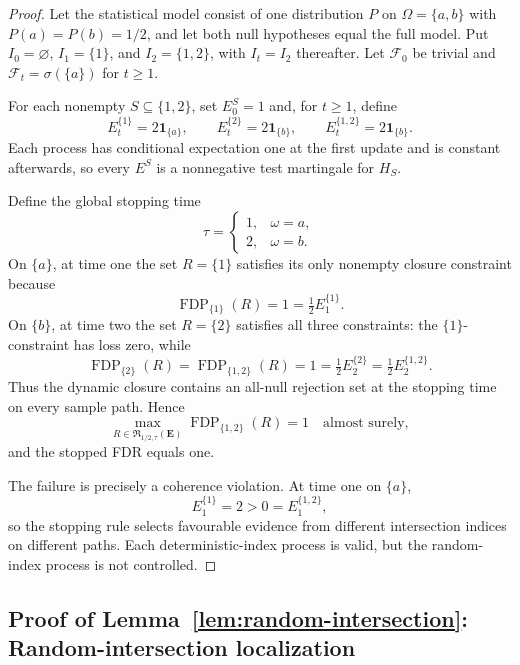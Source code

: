 \documentclass[11pt]{article}
\numberwithin{equation}{section}
\theoremstyle{plain}
\theoremstyle{definition}
\newcommand{\F}{\mathcal F}
\newcommand{\Rfam}{\mathfrak R}
\newcommand{\FDP}{\operatorname{FDP}}
\newcommand{\one}{\mathbf 1}
\begin{document}
\begin{proof}
Let the statistical model consist of one distribution $P$ on $\Omega=\{a,b\}$ with $P(a)=P(b)=1/2$, and let both null hypotheses equal the full model. Put $I_0=\varnothing$, $I_1=\{1\}$, and $I_2=\{1,2\}$, with $I_t=I_2$ thereafter. Let $\F_0$ be trivial and $\F_t=\sigma(\{a\})$ for $t\geq1$.

For each nonempty $S\subseteq\{1,2\}$, set $E_0^S=1$ and, for $t\geq1$, define
\[
 E_t^{\{1\}}=2\one_{\{a\}},\qquad
 E_t^{\{2\}}=2\one_{\{b\}},\qquad
 E_t^{\{1,2\}}=2\one_{\{b\}}.
\]
Each process has conditional expectation one at the first update and is constant afterwards, so every $E^S$ is a nonnegative test martingale for $H_S$.

Define the global stopping time
\[
 \tau=\begin{cases}1,&\omega=a,\\2,&\omega=b.\end{cases}
\]
On $\{a\}$, at time one the set $R=\{1\}$ satisfies its only nonempty closure constraint because
\[
 \FDP_{\{1\}}(R)=1=\tfrac12 E_1^{\{1\}}.
\]
On $\{b\}$, at time two the set $R=\{2\}$ satisfies all three constraints: the $\{1\}$-constraint has loss zero, while
\[
 \FDP_{\{2\}}(R)=\FDP_{\{1,2\}}(R)=1
 =\tfrac12E_2^{\{2\}}=\tfrac12E_2^{\{1,2\}}.
\]
Thus the dynamic closure contains an all-null rejection set at the stopping time on every sample path. Hence
\[
 \max_{R\in\Rfam_{1/2,\tau}(\mathbf E)}\FDP_{\{1,2\}}(R)=1
 \quad\text{almost surely},
\]
and the stopped FDR equals one.

The failure is precisely a coherence violation. At time one on $\{a\}$,
\[
 E_1^{\{1\}}=2>0=E_1^{\{1,2\}},
\]
so the stopping rule selects favourable evidence from different intersection indices on different paths. Each deterministic-index process is valid, but the random-index process is not controlled.
\end{proof}

\subsection{Proof of Lemma~\ref{lem:random-intersection}: Random-intersection localization}\label{app:proof-localization}
\end{document}
